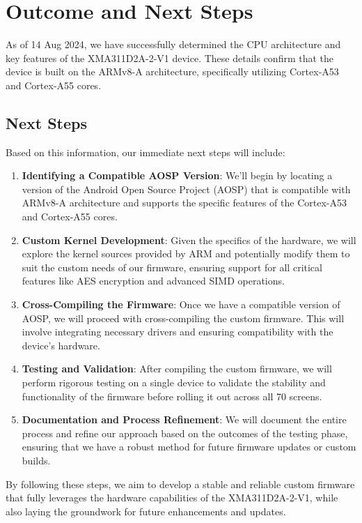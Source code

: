 \section{Outcome and Next Steps}
As of 14 Aug 2024, we have successfully determined the CPU architecture and key features of the XMA311D2A-2-V1 device. These details confirm that the device is built on the ARMv8-A architecture, specifically utilizing Cortex-A53 and Cortex-A55 cores.

\subsection{Next Steps}
Based on this information, our immediate next steps will include:

\begin{enumerate}
  \item \textbf{Identifying a Compatible AOSP Version}: We'll begin by locating a version of the Android Open Source Project (AOSP) that is compatible with ARMv8-A architecture and supports the specific features of the Cortex-A53 and Cortex-A55 cores.
  \item \textbf{Custom Kernel Development}: Given the specifics of the hardware, we will explore the kernel sources provided by ARM and potentially modify them to suit the custom needs of our firmware, ensuring support for all critical features like AES encryption and advanced SIMD operations.
  \item \textbf{Cross-Compiling the Firmware}: Once we have a compatible version of AOSP, we will proceed with cross-compiling the custom firmware. This will involve integrating necessary drivers and ensuring compatibility with the device's hardware.
  \item \textbf{Testing and Validation}: After compiling the custom firmware, we will perform rigorous testing on a single device to validate the stability and functionality of the firmware before rolling it out across all 70 screens.
  \item \textbf{Documentation and Process Refinement}: We will document the entire process and refine our approach based on the outcomes of the testing phase, ensuring that we have a robust method for future firmware updates or custom builds.
\end{enumerate}

By following these steps, we aim to develop a stable and reliable custom firmware that fully leverages the hardware capabilities of the XMA311D2A-2-V1, while also laying the groundwork for future enhancements and updates.